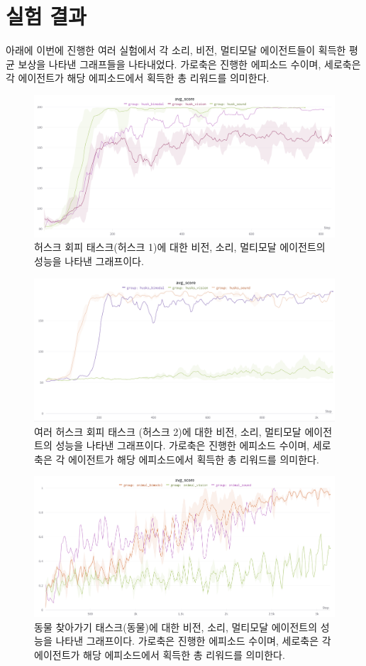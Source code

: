 \documentclass[oneside, under, ko]{snuthesis}
\begin{document}
\chapter{실험 결과}
아래에 이번에 진행한 여러 실험에서 각 소리, 비전, 멀티모달 에이전트들이 획득한 평균 보상을 나타낸 그래프들을 나타내었다. 가로축은 진행한 에피소드 수이며, 세로축은 각 에이전트가 해당 에피소드에서 획득한 총 리워드를 의미한다.
\begin{figure}[H]
    \centering
    \includegraphics[width=\textwidth]{husk.png}
    \caption{허스크 회피 태스크(허스크 1)에 대한 비전, 소리, 멀티모달 에이전트의 성능을 나타낸 그래프이다. }
    \label{fig:husk}
\end{figure}
\begin{figure}[H]
    \centering
    \includegraphics[width=\textwidth]{husks.png}
    \caption{여러 허스크 회피 태스크 (허스크 2)에 대한 비전, 소리, 멀티모달 에이전트의 성능을 나타낸 그래프이다. 가로축은 진행한 에피소드 수이며, 세로축은 각 에이전트가 해당 에피소드에서 획득한 총 리워드를 의미한다.}
    \label{fig:husks}
\end{figure}
\begin{figure}
    \centering
    \includegraphics[width=\textwidth]{animal.png}
    \caption{동물 찾아가기 태스크(동물)에 대한 비전, 소리, 멀티모달 에이전트의 성능을 나타낸 그래프이다. 가로축은 진행한 에피소드 수이며, 세로축은 각 에이전트가 해당 에피소드에서 획득한 총 리워드를 의미한다.}
    \label{fig:animal}
\end{figure}
\end{document}
